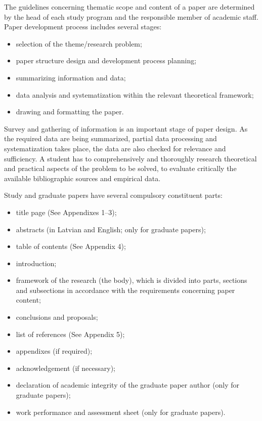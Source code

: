 The guidelines concerning thematic scope and content of a paper are determined by the head of each study program and the responsible member of academic staff. Paper development process includes several stages:
\begin{itemize}
  \item selection of the theme/research problem;
  \item paper structure design and development process planning;
  \item summarizing information and data;
  \item data analysis and systematization within the relevant theoretical framework;
  \item drawing and formatting the paper.
\end{itemize}

Survey and gathering of information is an important stage of paper design. As the required data are being summarized, partial data processing and systematization takes place, the data are also checked for relevance and sufficiency. A student has to comprehensively and thoroughly research theoretical and practical aspects of the problem to be solved, to evaluate critically the available bibliographic sources and empirical data.

Study and graduate papers have several compulsory constituent parts:
\begin{itemize}
  \item title page (See Appendixes 1–3);
  \item abstracts (in Latvian and English; only for graduate papers);
  \item table of contents (See Appendix 4);
  \item introduction;
  \item framework of the research (the body), which is divided into parts, sections and subsections in accordance with the requirements concerning paper content;
  \item conclusions and proposals;
  \item list of references (See Appendix 5);
  \item appendixes (if required);
  \item acknowledgement (if necessary);
  \item declaration of academic integrity of the graduate paper author (only for graduate papers);
  \item work performance and assessment sheet (only for graduate papers).
\end{itemize}

